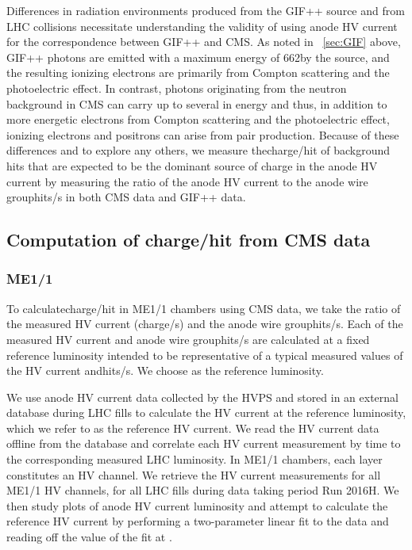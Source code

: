 Differences in radiation environments produced from the GIF++ source and from LHC \pp collisions necessitate understanding the validity of using anode HV current for the correspondence between GIF++ and CMS. As noted in \Sec~\ref{sec:GIF} above, GIF++ photons are emitted with a maximum energy of 662\keV by the  source, and the resulting ionizing electrons are primarily from Compton scattering and the photoelectric effect. In contrast, photons originating from the neutron background in CMS can carry up to several \MeVns in energy and thus, in addition to more energetic electrons from Compton scattering and the photoelectric effect, ionizing electrons and positrons can arise from pair production. Because of these differences and to explore any others, we measure the\unit{charge/hit} of background hits that are expected to be the dominant source of charge in the anode HV current by measuring the ratio of the anode HV current to the anode wire group\unit{hits/s} in both CMS data and GIF++ data.

\subsection{Computation of charge/hit from CMS data}

\subsubsection{ME1/1}
To calculate\unit{charge/hit} in ME1/1 chambers using CMS data, we take the ratio of the measured HV current (\unit{charge/s}) and the anode wire group\unit{hits/s}. Each of the measured HV current and anode wire group\unit{hits/s} are calculated at a fixed reference luminosity intended to be representative of a typical measured values of the HV current and\unit{hits/s}. We choose  as the reference luminosity.

We use anode HV current data collected by the HVPS and stored in an external database during LHC fills to calculate the HV current at the reference luminosity, which we refer to as the reference HV current. We read the HV current data offline from the database and correlate each HV current measurement by time to the corresponding measured LHC luminosity. In ME1/1 chambers, each layer constitutes an HV channel. We retrieve the HV current measurements for all ME1/1 HV channels, for all LHC fills during data taking period Run 2016H. We then study plots of anode HV current \vs luminosity and attempt to calculate the reference HV current by performing a two-parameter linear fit to the data and reading off the value of the fit at . 


